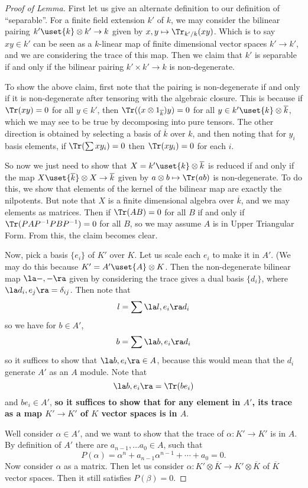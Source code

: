 \documentclass[12 pt]{article}
\theoremstyle{definition}
\begin{document}
\begin{proof}[Proof of Lemma]

First let us give an alternate definition to our definition of ``separable''. For a finite field extension $k'$ of $k$, we may consider the bilinear pairing $k' \uset{k}\otimes k' \to k$ given by $x,y \mapsto \Tr_{k'/k}(xy)$. Which is to say $xy \in k'$ can be seen as a $k$-linear map of finite dimensional vector spaces $k' \to k'$, and we are considering the trace of this map. Then we claim that $k'$ is separable if and only if the bilinear pairing $k' \times k' \to k$ is non-degenerate.

To show the above claim, first note that the pairing is non-degenerate if and only if it is non-degenerate after tensoring with the algebraic closure. This is because if $\Tr(xy)=0$ for all $y \in k'$, then $\Tr((x\otimes 1_{\overline{k}})y)=0$ for all $y \in k' \uset{k}\otimes \overline{k}$, which we may see to be true by decomposing into pure tensors. The other direction is obtained by selecting a basis of $\overline{k}$ over $k$, and then noting that for $y_i$ basis elements, if $\Tr(\sum x y_i)=0$ then $\Tr(xy_i)=0$ for each $i$. 

So now we just need to show that $X=k' \uset{k} \otimes \overline{k}$ is reduced if and only if the map $X \uset{\overline{k}}\otimes X \to \overline{k}$ given by $a \otimes b \mapsto \Tr(ab)$ is non-degenerate. To do this, we show that elements of the kernel of the bilinear map are exactly the nilpotents. But note that $X$ is a finite dimensional algebra over $\overline{k}$, and we may elements as matrices. Then if $\Tr(AB)=0$ for all $B$ if and only if $\Tr(PAP^{-1}PBP^{-1})=0$ for all $B$, so we may assume $A$ is in Upper Triangular Form. From this, the claim becomes clear.


Now, pick a basis $\{e_i\}$ of $K'$ over $K$. Let us scale each $e_i$ to make it in  $A'$. (We may do this because $K'=A' \uset{A}\otimes K$. Then the non-degenerate bilinear map $\la - , - \ra$ given by considering the trace gives a dual basis $\{d_i\}$, where $\la d_i, e_j \ra=\delta_{ij}$. Then note that
\[l=\sum \la l, e_i \ra d_i\]
so we have for $b \in A'$,
\[b= \sum \la b, e_i \ra d_i\]
so it suffices to show that $\la b, e_i \ra \in A$, because this would mean that the $d_i$ generate $A'$ as an $A$ module. Note that
\[\la b, e_i \ra=\Tr(be_i)\]
and $be_i \in A'$, \textbf{so it suffices to show that for any element in $A'$, its trace as a map $K' \to K'$ of $K$ vector spaces is in $A$}.

Well consider $\alpha \in A'$, and we want to show that the trace of $\alpha:K' \to K'$ is in $A$. By definition of $A'$ there are $a_{n-1}, \ldots a_0 \in A$, such that
\[P(\alpha)=\alpha^n+a_{n-1}\alpha^{n-1}+ \cdots +a_0=0.\]
Now consider $\alpha$ as a matrix. Then let us consider $\alpha:K' \otimes \overline{K} \to K' \otimes \overline{K}$ of $\overline{K}$ vector spaces. Then it still satisfies $P(\beta)=0$.


\end{proof}
\end{document}
